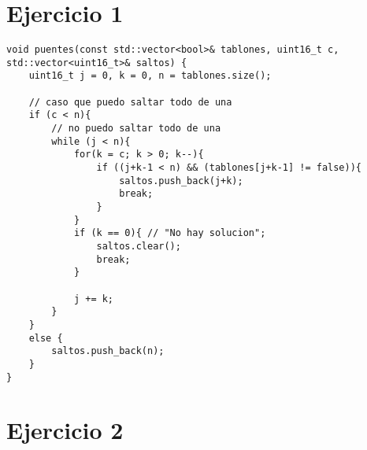 \appendix



\section{Ejercicio 1} \label{App:AppendixA}

\begin{frame}

\begin{lstlisting}
void puentes(const std::vector<bool>& tablones, uint16_t c, std::vector<uint16_t>& saltos) {
	uint16_t j = 0, k = 0, n = tablones.size();

	// caso que puedo saltar todo de una
	if (c < n){
		// no puedo saltar todo de una
		while (j < n){
			for(k = c; k > 0; k--){
				if ((j+k-1 < n) && (tablones[j+k-1] != false)){
					saltos.push_back(j+k);
					break;
				}
			}
			if (k == 0){ // "No hay solucion";
				saltos.clear();
				break;
			}

			j += k;
		}
	}
	else {
		saltos.push_back(n);
	}
}

\end{lstlisting}
\end{frame}

\newpage
\section{Ejercicio 2} \label{App:AppendixB}

